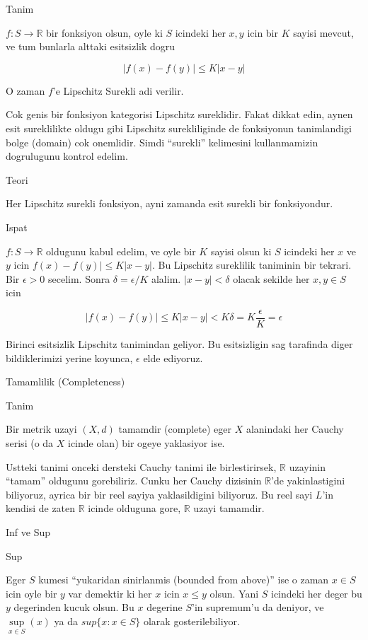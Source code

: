 \documentclass[12pt,fleqn]{article}
\begin{document}
Tanim 

$f:S \to \mathbb{R}$ bir fonksiyon olsun, oyle ki $S$ icindeki her $x,y$
icin bir $K$ sayisi mevcut, ve tum bunlarla alttaki esitsizlik 
dogru

\[ |f(x) - f(y)| \le K|x-y| \]

O zaman $f$'e Lipschitz Surekli adi verilir. 

Cok genis bir fonksiyon kategorisi Lipschitz sureklidir. Fakat dikkat edin,
aynen esit sureklilikte oldugu gibi Lipschitz surekliliginde de fonksiyonun
tanimlandigi bolge (domain) cok onemlidir. Simdi ``surekli'' kelimesini
kullanmamizin dogrulugunu kontrol edelim. 

Teori 

Her Lipschitz surekli fonksiyon, ayni zamanda esit surekli bir
fonksiyondur. 

Ispat

$f: S \to \mathbb{R}$ oldugunu kabul edelim, ve oyle bir $K$ sayisi olsun ki $S$
icindeki her $x$ ve $y$ icin $f(x) - f(y)| \le K|x-y|$. Bu Lipschitz sureklilik
taniminin bir tekrari. Bir $\epsilon > 0$ secelim. Sonra $\delta =
\epsilon / K$ alalim. 
$|x-y| < \delta$ olacak sekilde her $x,y \in S$ icin 

\[ |f(x) - f(y)| \le K|x-y| < K\delta = K \frac{ \epsilon}{K} = \epsilon \]

Birinci esitsizlik Lipschitz tanimindan geliyor. Bu esitsizligin sag
tarafinda diger bildiklerimizi yerine koyunca, $\epsilon$ elde ediyoruz. 

Tamamlilik (Completeness) 

Tanim

Bir metrik uzayi $(X,d)$ tamamdir (complete) eger $X$ alanindaki her Cauchy
serisi (o da $X$ icinde olan) bir ogeye yaklasiyor ise. 

Ustteki tanimi onceki dersteki Cauchy tanimi ile birlestirirsek,
$\mathbb{R}$ uzayinin ``tamam'' oldugunu gorebiliriz. Cunku her Cauchy
dizisinin $\mathbb{R}$'de yakinlastigini biliyoruz, ayrica bir bir reel sayiya
yaklasildigini biliyoruz. Bu reel sayi $L$'in kendisi de zaten $\mathbb{R}$ icinde
olduguna gore, $\mathbb{R}$ uzayi tamamdir. 

Inf ve Sup

Sup

Eger $S$ kumesi ``yukaridan sinirlanmis (bounded from above)'' ise o zaman
$x \in S$ icin oyle bir $y$ var demektir ki her $x$ icin $x \le y$
olsun. Yani $S$ icindeki her deger bu $y$ degerinden kucuk olsun. Bu $x$
degerine $S$'in supremum'u da deniyor, ve $\sup\limits_{x \in S}(x)$ ya da
$sup\{x:x \in S\}$ olarak gosterilebiliyor. 
\end{document}
